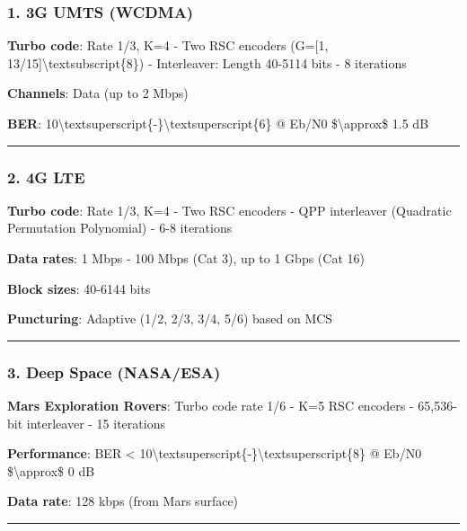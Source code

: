 \subsubsection{1. 3G UMTS (WCDMA)}\label{g-umts-wcdma}

\textbf{Turbo code}: Rate 1/3, K=4 - Two RSC encoders (G={[}1,
13/15{]}\textbackslash textsubscript\{8\}) - Interleaver: Length 40-5114
bits - 8 iterations

\textbf{Channels}: Data (up to 2 Mbps)

\textbf{BER}:
10\textbackslash textsuperscript\{-\}\textbackslash textsuperscript\{6\}
@ Eb/N0 \$\textbackslash approx\$ 1.5 dB

\begin{center}\rule{0.5\linewidth}{0.5pt}\end{center}

\subsubsection{2. 4G LTE}\label{g-lte}

\textbf{Turbo code}: Rate 1/3, K=4 - Two RSC encoders - QPP interleaver
(Quadratic Permutation Polynomial) - 6-8 iterations

\textbf{Data rates}: 1 Mbps - 100 Mbps (Cat 3), up to 1 Gbps (Cat 16)

\textbf{Block sizes}: 40-6144 bits

\textbf{Puncturing}: Adaptive (1/2, 2/3, 3/4, 5/6) based on MCS

\begin{center}\rule{0.5\linewidth}{0.5pt}\end{center}

\subsubsection{3. Deep Space (NASA/ESA)}\label{deep-space-nasaesa}

\textbf{Mars Exploration Rovers}: Turbo code rate 1/6 - K=5 RSC encoders
- 65,536-bit interleaver - 15 iterations

\textbf{Performance}: BER \textless{}
10\textbackslash textsuperscript\{-\}\textbackslash textsuperscript\{8\}
@ Eb/N0 \$\textbackslash approx\$ 0 dB

\textbf{Data rate}: 128 kbps (from Mars surface)

\begin{center}\rule{0.5\linewidth}{0.5pt}\end{center}


